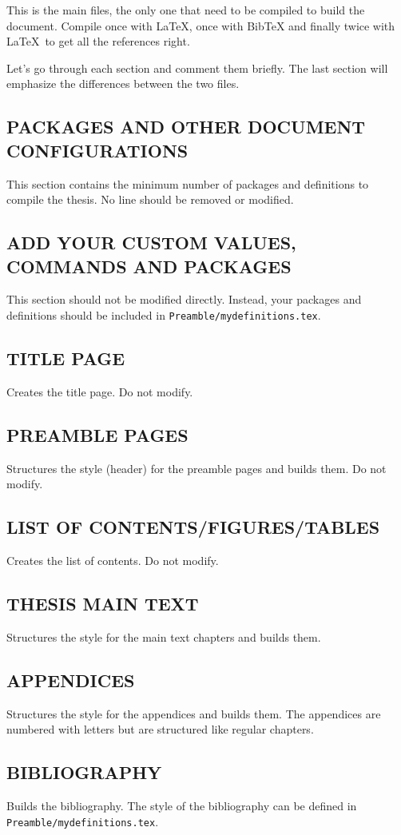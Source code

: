 This is the main files, the only one that need to be compiled to build the document. Compile once with \LaTeX, once with BibTeX and finally twice with \LaTeX\ to get all the references right.

Let's go through each section and comment them briefly. The last section will emphasize the differences between the two files.

\subsection{PACKAGES AND OTHER DOCUMENT CONFIGURATIONS}

This section contains the minimum number of packages and definitions to compile the thesis. No line should be removed or modified.

\subsection{ADD YOUR CUSTOM VALUES, COMMANDS AND PACKAGES}

This section should not be modified directly. Instead, your packages and definitions should be included in  \texttt{Preamble/mydefinitions.tex}.

\subsection{TITLE PAGE}

Creates the title page. Do not modify.

\subsection{PREAMBLE PAGES}

Structures the style (header) for the preamble pages and builds them. Do not modify.

\subsection{LIST OF CONTENTS/FIGURES/TABLES}

Creates the list of contents. Do not modify.

\subsection{THESIS MAIN TEXT}

Structures the style for the main text chapters and builds them. 

\subsection{APPENDICES}

Structures the style for the appendices and builds them. The appendices are numbered with letters but are structured like regular chapters.

\subsection{BIBLIOGRAPHY}

Builds the bibliography. The style of the bibliography can be defined in \texttt{Preamble/mydefinitions.tex}.

